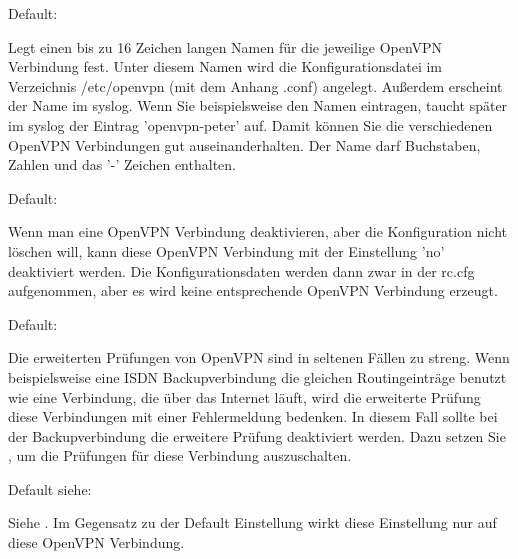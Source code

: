 \begin{description}


  Default: 

  Legt einen bis zu 16 Zeichen langen Namen für die jeweilige OpenVPN
  Verbindung fest.  Unter diesem Namen wird die Konfigurationsdatei im
  Verzeichnis /etc/openvpn (mit dem Anhang .conf) angelegt.  Außerdem
  erscheint der Name im syslog.  Wenn Sie beispielsweise den Namen
   eintragen, taucht später im syslog der Eintrag
  'openvpn-peter' auf.  Damit können Sie die verschiedenen OpenVPN
  Verbindungen gut auseinanderhalten. Der Name darf Buchstaben, Zahlen
  und das '-' Zeichen enthalten.


  Default: 

  Wenn man eine OpenVPN Verbindung deaktivieren, aber die
  Konfiguration nicht löschen will, kann diese OpenVPN Verbindung mit
  der Einstellung 'no' deaktiviert werden. Die Konfigurationsdaten
  werden dann zwar in der rc.cfg aufgenommen, aber es wird keine
  entsprechende OpenVPN Verbindung erzeugt.


  Default: 

  Die erweiterten Prüfungen von OpenVPN sind in seltenen Fällen zu
  streng. Wenn beispielsweise eine ISDN Backupverbindung die gleichen
  Routingeinträge benutzt wie eine Verbindung, die über das Internet
  läuft, wird die erweiterte Prüfung diese Verbindungen mit einer
  Fehlermeldung bedenken. In diesem Fall sollte bei der
  Backupverbindung die erweitere Prüfung deaktiviert werden. Dazu
  setzen Sie , um die Prüfungen
  für diese Verbindung auszuschalten.


  Default siehe: 

  Siehe . Im
  Gegensatz zu der Default Einstellung wirkt diese Einstellung nur auf
  diese OpenVPN Verbindung.



\end{description}
